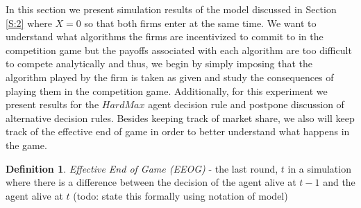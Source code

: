 \documentclass{article}
\theoremstyle{definition}
\newtheorem{definition}{Definition}[section]
\begin{document}
In this section we present simulation results of the model discussed in Section \ref{S:2} where $X = 0$ so that both firms enter at the same time. We want to understand what algorithms the firms are incentivized to commit to in the competition game but the payoffs associated with each algorithm are too difficult to compete analytically and thus, we begin by simply imposing that the algorithm played by the firm is taken as given and study the consequences of playing them in the competition game. Additionally, for this experiment we present results for the $HardMax$ agent decision rule and postpone discussion of alternative decision rules. Besides keeping track of market share, we also will keep track of the effective end of game in order to better understand what happens in the game.

\begin{definition}
\textit{Effective End of Game (EEOG)} - the last round, $t$ in a simulation where there is a difference between the decision of the agent alive at $t-1$ and the agent alive at $t$ (todo: state this formally using notation of model)
\end{definition}
\end{document}
